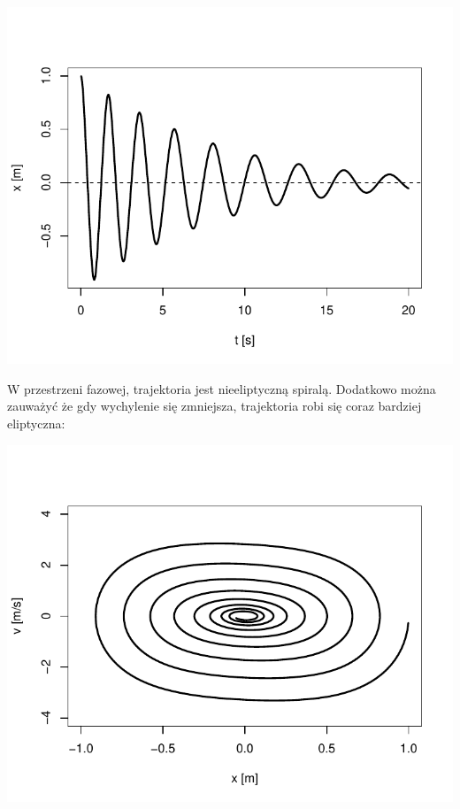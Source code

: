 \documentclass[12pt]{sprawozdanie}
\begin{document}
\begin{center}\includegraphics{info2_files/figure-latex/nonlinear-dump-solution-1} \end{center}

W przestrzeni fazowej, trajektoria jest nieeliptyczną spiralą. Dodatkowo
można zauważyć że gdy wychylenie się zmniejsza, trajektoria robi się
coraz bardziej eliptyczna:

\begin{center}\includegraphics{info2_files/figure-latex/nonlinear-dump-phase-1} \end{center}
\end{document}
